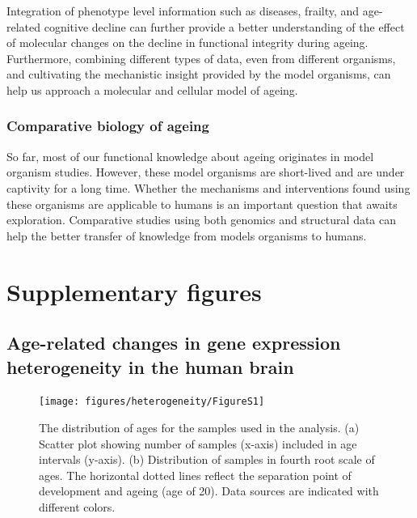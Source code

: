 \documentclass[12pt,twoside]{unicam}
\begin{document}
Integration of phenotype level information such as diseases, frailty, and age-related cognitive decline can further provide a better understanding of the effect of molecular changes on the decline in functional integrity during ageing. Furthermore, combining different types of data, even from different organisms, and cultivating the mechanistic insight provided by the model organisms, can help us approach a molecular and cellular model of ageing.

\hypertarget{comparative-biology-of-ageing}{%
\subsection{Comparative biology of ageing}\label{comparative-biology-of-ageing}}

So far, most of our functional knowledge about ageing originates in model organism studies. However, these model organisms are short-lived and are under captivity for a long time. Whether the mechanisms and interventions found using these organisms are applicable to humans is an important question that awaits exploration. Comparative studies using both genomics and structural data can help the better transfer of knowledge from models organisms to humans.

\appendix

\hypertarget{supplementary-figures}{%
\chapter{Supplementary figures}\label{supplementary-figures}}

\hypertarget{age-related-changes-in-gene-expression-heterogeneity-in-the-human-brain}{%
\section{Age-related changes in gene expression heterogeneity in the human brain}\label{age-related-changes-in-gene-expression-heterogeneity-in-the-human-brain}}

\begin{figure}

{\centering \texttt{[image: figures/heterogeneity/FigureS1]} 

}

\caption[Age distribution of individual datasets,]{The distribution of ages for the samples used in the analysis. (a) Scatter plot showing number of samples (x-axis) included in age intervals (y-axis). (b) Distribution of samples in fourth root scale of ages. The horizontal dotted lines reflect the separation point of development and ageing (age of 20). Data sources are indicated with different colors.}\label{fig:hetFigS1}
\end{figure}
\end{document}
